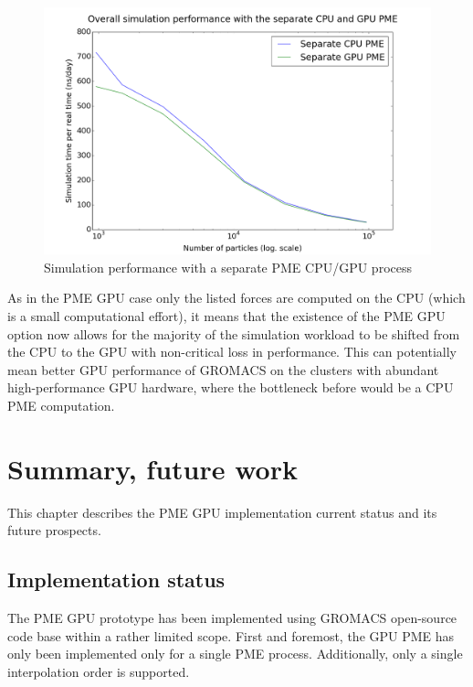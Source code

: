 \documentclass[12pt,a4paper]{report}
\newcommand{\draft}[1]{#1}
\begin{document}
\FloatBarrier
\begin{figure} [h!]
    \centering
    \includegraphics[width=1\textwidth]{pics/GPUCPU.png}
    \caption{Simulation performance with a separate PME CPU/GPU process}
    \label{fig:sepGPU}
\end{figure}
\FloatBarrier

As in the PME GPU case only the listed forces are computed on the CPU (which is a small computational effort), it means that the existence of the PME GPU option now allows for the majority of the simulation workload to be shifted from the CPU to the GPU with non-critical loss in performance. This can potentially mean better GPU performance of GROMACS on the clusters with abundant high-performance GPU hardware, where the bottleneck before would be a CPU PME computation.






\newpage
\chapter{Summary, future work}
This chapter describes the PME GPU implementation current status and its future prospects.

\section{Implementation status}
The PME GPU prototype has been implemented using GROMACS open-source code base within a rather limited scope. First and foremost, the GPU PME has only been implemented only for a single PME process. Additionally, only a single interpolation order is supported.
\end{document}
